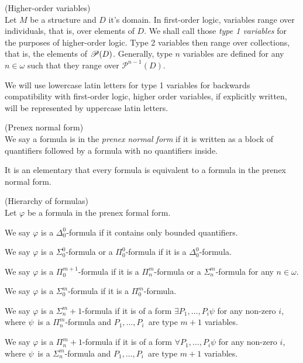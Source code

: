 \begin{definition}{(Higher-order variables)}\label{def:higher_order_variables}\\
Let $M$ be a structure and $D$ it's domain. In first-order logic, variables range over individuals, that is, over elements of $D$. We shall call those \emph{type 1 variables} for the purposes of higher-order logic. Type 2 variables then range over collections, that is, the elements of $\mathscr{P} (D)$. Generally, type $n$ variables are defined for any $n \in \omega$ such that they range over $\mathscr{P}^{n-1}(D)$.
\end{definition}
We will use lowercase latin letters for type 1 variables for backwards compatibility with first-order logic, higher order variables, if explicitly written, will be represented by uppercase latin letters.

\begin{definition}{(Prenex normal form)}\label{def:pnf}\\
We say a formula is in the \emph{prenex normal form} if it is written as a block of quantifiers followed by a formula with no quantifiers inside.
\end{definition}
It is an elementary that every formula is equivalent to a formula in the prenex normal form.



\begin{definition}{(Hierarchy of formulas)}\label{def:analytical_hierarchy}\\
Let $\varphi$ be a formula in the prenex formal form.
\bce[(i)]
\item We say $\varphi$ is a $\Delta^0_0$-formula if it contains only bounded quantifiers.
\item We say $\varphi$ is a $\Sigma^0_0$-formula or a $\Pi^0_0$-formula if it is a $\Delta^0_0$-formula.
\item We say $\varphi$ is a $\Pi^{m+1}_0$-formula if it is a $\Pi^m_n$-formula or a $\Sigma^m_n$-formula for any $n \in \omega$.
\item We say $\varphi$ is a $\Sigma^m_0$-formula if it is a $\Pi^m_0$-formula.
\item We say $\varphi$ is a $\Sigma^m_n+1$-formula if it is of a form $\exists P_1, \ldots, P_i \psi$ for any non-zero $i$, where $\psi$ is a $\Pi^m_n$-formula and $P_1, \ldots, P_i$ are type $m+1$ variables.
\item We say $\varphi$ is a $\Pi^m_n+1$-formula if it is of a form $\forall P_1, \ldots, P_i \psi$ for any non-zero $i$, where $\psi$ is a $\Sigma^m_n$-formula and $P_1, \ldots, P_i$ are type $m+1$ variables.
\ece
\end{definition}

